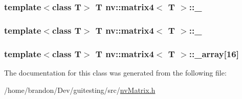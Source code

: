 \hypertarget{classnv_1_1matrix4_ebd9a2934f01f79339dd1ec8e2acbff5}{
\subsubsection[{\_\-43}]{\setlength{\rightskip}{0pt plus 5cm}template$<$class T$>$ T {\bf nv::matrix4}$<$ T $>$::{\bf \_}}}
\label{classnv_1_1matrix4_ebd9a2934f01f79339dd1ec8e2acbff5}


\hypertarget{classnv_1_1matrix4_d3ea6d1a8729755662f0e3b2e4454d8c}{
\subsubsection[{\_\-44}]{\setlength{\rightskip}{0pt plus 5cm}template$<$class T$>$ T {\bf nv::matrix4}$<$ T $>$::{\bf \_}}}
\label{classnv_1_1matrix4_d3ea6d1a8729755662f0e3b2e4454d8c}


\hypertarget{classnv_1_1matrix4_a756b9f94bc522d9e68ce13c0a71f312}{
\subsubsection[{\_\-array}]{\setlength{\rightskip}{0pt plus 5cm}template$<$class T$>$ T {\bf nv::matrix4}$<$ T $>$::{\bf \_\-array}\mbox{[}16\mbox{]}}}
\label{classnv_1_1matrix4_a756b9f94bc522d9e68ce13c0a71f312}




The documentation for this class was generated from the following file:\begin{CompactItemize}
\item 
/home/brandon/Dev/guitesting/src/\hyperlink{nv_matrix_8h}{nvMatrix.h}\end{CompactItemize}

